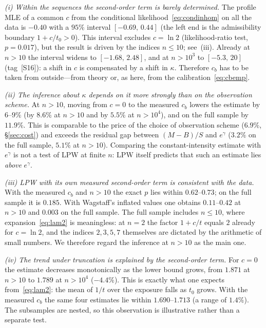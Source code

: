 \documentclass[11pt,a4paper]{article}
\theoremstyle{plain}
\theoremstyle{remark}
\newcommand{\eg}{e^{\gamma}}
\begin{document}
\emph{(i) Within the sequences the second-order term is barely determined.} The
profile MLE of a common $c$ from the conditional likelihood~\eqref{eq:condinhom}
on all the data is $-0.40$ with a $95\%$ interval $[-0.69,\,0.44]$ (the left end
is the admissibility boundary $1+c/t_0>0$). This interval excludes $c=\ln2$
(likelihood-ratio test, $p=0.017$), but the result is driven by the indices
$n\le10$; see~(iii). Already at $n>10$ the interval widens to $[-1.68,\,2.48]$,
and at $n>10^3$ to $[-5.3,\,20]$ (tag~[S16]): a shift in $c$ is compensated by a
shift in $\kappa$. Therefore $c_b$ has to be taken from outside---from theory
or, as here, from the calibration~\eqref{eq:cbemp}.

\emph{(ii) The inference about $\kappa$ depends on it more strongly than on the
observation scheme.} At $n>10$, moving from $c=0$ to the measured $c_b$ lowers
the estimate by $6$--$9\%$ (by $8.6\%$ at $n>10$ and by $5.5\%$ at $n>10^4$), and
on the full sample by $11.9\%$. This is comparable to the price of the choice of
observation scheme ($6.9\%$, \S\ref{sec:cost}) and exceeds the residual gap
between $(M-B)/S$ and $\eg$ ($3.2\%$ on the full sample, $5.1\%$ at $n>10$).
Comparing the constant-intensity estimate with $\eg$ is not a test of LPW at
finite $n$: LPW itself predicts that such an estimate lies \emph{above} $\eg$.

\emph{(iii) LPW with its own measured second-order term is consistent with the
data.} With the measured $c_b$ and $n>10$ the exact $p$ lies within
$0.62$--$0.73$; on the full sample it is $0.185$. With Wagstaff's inflated values
one obtains $0.11$--$0.42$ at $n>10$ and $0.003$ on the full sample. The full
sample includes $n\le10$, where expansion~\eqref{eq:lam2} is meaningless: at
$n=2$ the factor $1+c/t$ equals $2$ already for $c=\ln2$, and the indices
$2,3,5,7$ themselves are dictated by the arithmetic of small numbers. We
therefore regard the inference at $n>10$ as the main one.

\emph{(iv) The trend under truncation is explained by the second-order term.}
For $c=0$ the estimate decreases monotonically as the lower bound grows, from
$1.871$ at $n>10$ to $1.789$ at $n>10^4$ ($-4.4\%$). This is exactly what one
expects from~\eqref{eq:lam2}: the mean of $1/t$ over the exposure falls as $t_0$
grows. With the measured $c_b$ the same four estimates lie within
$1.690$--$1.713$ (a range of $1.4\%$). The subsamples are nested, so this observation is illustrative
rather than a separate test.
\end{document}
